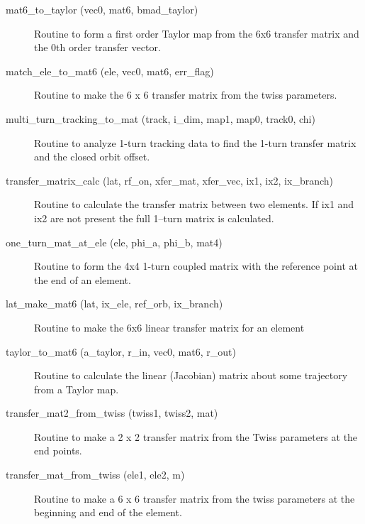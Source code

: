 \begin{description}
\item[mat6_to_taylor (vec0, mat6, bmad_taylor)] \Newline
Routine to form a first order Taylor map from the 6x6 transfer matrix 
and the 0th order transfer vector. 

\label{r:match.ele.to.mat6}
\item[match_ele_to_mat6 (ele, vec0, mat6, err_flag)] \Newline 
Routine to make the 6 x 6 transfer matrix from the twiss parameters.

\item[multi_turn_tracking_to_mat (track, i_dim, map1, map0, track0, chi)] \Newline
Routine to analyze 1-turn tracking data to find the 1-turn transfer matrix 
and the closed orbit offset.

\label{r:transfer.matrix.calc}
\item[transfer_matrix_calc (lat, rf_on, xfer_mat, xfer_vec, ix1, ix2, ix_branch)] \Newline
Routine to calculate the transfer matrix between two elements. If
ix1 and ix2 are not present the full 1--turn matrix is calculated.

\label{r:one.turn.mat.at.ele}
\item[one_turn_mat_at_ele (ele, phi_a, phi_b, mat4)] \Newline
Routine to form the 4x4 1-turn coupled matrix with the reference point 
at the end of an element. 

\label{r:lat.make.mat6}
\item[lat_make_mat6 (lat, ix_ele, ref_orb, ix_branch)] \Newline
Routine to make the 6x6 linear transfer matrix for an element 

\item[taylor_to_mat6 (a_taylor, r_in, vec0, mat6, r_out)] \Newline
Routine to calculate the linear (Jacobian) matrix about some trajectory from a Taylor map. 

\label{r:transfer.mat2.from.twiss}
\item[transfer_mat2_from_twiss (twiss1, twiss2, mat)] \Newline
Routine to make a 2 x 2 transfer matrix from the Twiss parameters at the end points. 

\label{r:transfer.mat.from.twiss}
\item[transfer_mat_from_twiss (ele1, ele2, m)] \Newline 
Routine to make a 6 x 6 transfer matrix from the twiss parameters
at the beginning and end of the element.


\end{description}
